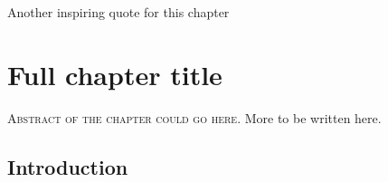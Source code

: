 
\begin{savequote}[75mm]
Another inspiring quote for this chapter
\end{savequote}


\chapter[short version title for TOC]{Full chapter title}

\lettrine[lines=3]{\textcolor{SchoolColor}{A}}{bstract of the chapter could go here}.
More to be written here.
\lipsum[1]

\section{Introduction}

\lipsum[5-7]

